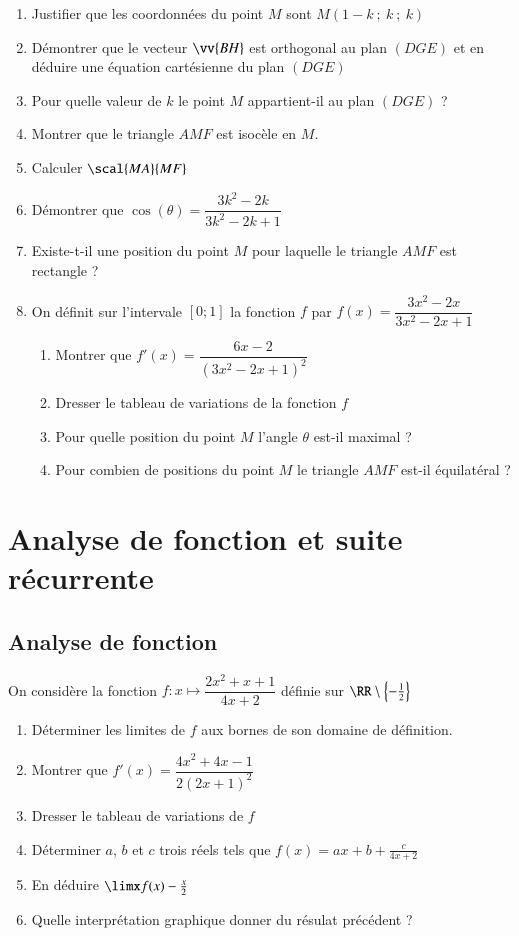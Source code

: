 \documentclass[oneside,12pt]{article}
\let\oldsection\section
\renewcommand{\section}{\newpage\oldsection}
\begin{document}
\begin{enumerate}
    \item Justifier que les coordonnées du point $M$ sont $M(1-k~;~k~;~k)$
    \item Démontrer que le vecteur $\vv{BH}$ est orthogonal au plan $(DGE)$ et en déduire une équation cartésienne du plan $(DGE)$
    \item Pour quelle valeur de $k$ le point $M$ appartient-il au plan $(DGE)$ ?
    \item Montrer que le triangle $AMF$ est isocèle en $M$.
    \item Calculer $\scal{MA}{MF}$
    \item Démontrer que $\cos(\theta)=\dfrac{3k^2-2k}{3k^2-2k+1}$
    \item Existe-t-il une position du point $M$ pour laquelle le triangle $AMF$ est rectangle ?
    \item On définit sur l'intervale $[0;1]$ la fonction $f$ par $f(x)=\dfrac{3x^2-2x}{3x^2-2x+1}$
    \begin{enumerate}
        \item Montrer que $f'(x)=\dfrac{6x-2}{(3x^2-2x+1)^2}$
        \item Dresser le tableau de variations de la fonction $f$
        \item Pour quelle position du point $M$ l'angle $\theta$ est-il maximal ?
        \item Pour combien de positions du point $M$ le triangle $AMF$ est-il équilatéral ?
    \end{enumerate}
\end{enumerate}





\section{Analyse de fonction et suite récurrente}
\subsection{Analyse de fonction}
On considère la fonction $f:x\mapsto\dfrac{2x^2+x+1}{4x+2}$ définie sur $\RR\setminus\left\{-\frac{1}{2}\right\}$
\begin{enumerate}
    \item Déterminer les limites de $f$ aux bornes de son domaine de définition.
    \item Montrer que $f'(x)=\dfrac{4x^2+4x-1}{2(2x+1)^2}$
    \item Dresser le tableau de variations de $f$
    \item Déterminer $a$, $b$ et $c$ trois réels tels que $f(x)=ax+b+\frac{c}{4x+2}$
    \item En déduire $\limx f(x)-\frac{x}{2}$
    \item Quelle interprétation graphique donner du résulat précédent ?
\end{enumerate}
\end{document}
